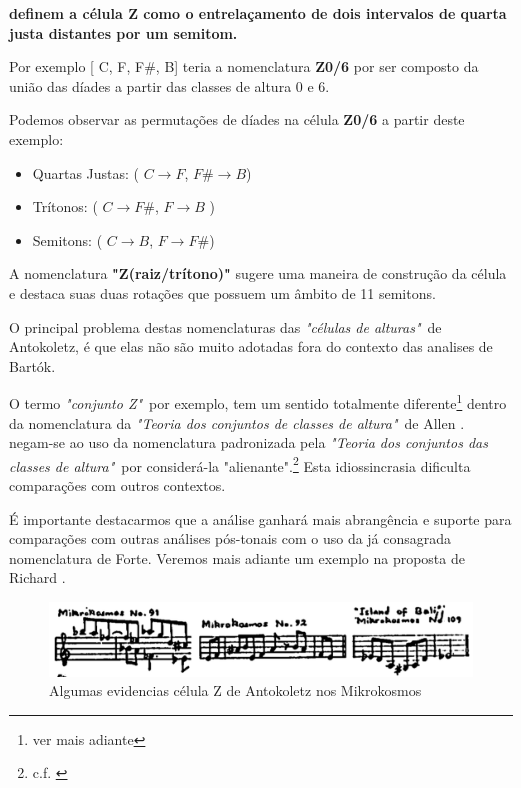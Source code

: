\documentclass[
	12pt,				%
	openright,			%
	twoside,			%
	a4paper,			%
	english,			%
	french,				%
	spanish,			%
	brazil				%
	]{abntex2}
\begin{document}
 \textbf{definem a célula Z como o entrelaçamento de dois intervalos de quarta justa distantes por um semitom.} 

Por exemplo [ C, F, F\#, B] teria a nomenclatura \textbf{Z0/6} por ser composto da união das díades a partir das classes de altura 0 e 6. 

Podemos observar as permutações de díades na célula \textbf{Z0/6} a partir deste exemplo:

\begin{itemize}
\item Quartas Justas: ( $C \rightarrow F$, $F\# \rightarrow B$) 

\item Trítonos: ( $C \rightarrow F\#$, $F \rightarrow B$ )

\item Semitons: ( $C \rightarrow B$, $F \rightarrow F\#$)
\end{itemize}


A nomenclatura \textbf{"Z(raiz/trítono)"} sugere uma maneira de construção da célula e destaca suas duas rotações que possuem um âmbito de 11 semitons. 

O principal problema destas nomenclaturas das \textit{"células de alturas"}\ de Antokoletz, é que elas não são muito adotadas fora do contexto das analises de Bartók.

O termo \textit{"conjunto Z"}\, por exemplo, tem um sentido totalmente diferente\footnote{ver mais adiante} dentro da nomenclatura da  \textit{"Teoria dos conjuntos de classes de altura"}\ de Allen .  negam-se ao uso da nomenclatura padronizada pela \textit{"Teoria dos conjuntos das classes de altura"}\ por considerá-la "alienante".\footnote{c.f. \cite[ p.xiii]{susanni_antokoletz2012music}} Esta idiossincrasia dificulta comparações com outros contextos.

É importante destacarmos que a análise ganhará mais abrangência e suporte para comparações com outras análises pós-tonais com o uso da já consagrada nomenclatura de Forte. Veremos mais adiante um exemplo na proposta de Richard . 


\begin{figure}[!h]
	\caption{\label{fig_grafico}Algumas evidencias célula Z  de Antokoletz nos Mikrokosmos }
	\begin{center}
	    \includegraphics[scale=0.4]{intervalar/Lendvai_p52_ZCell.png}
	\end{center}
\end{figure}
\end{document}
